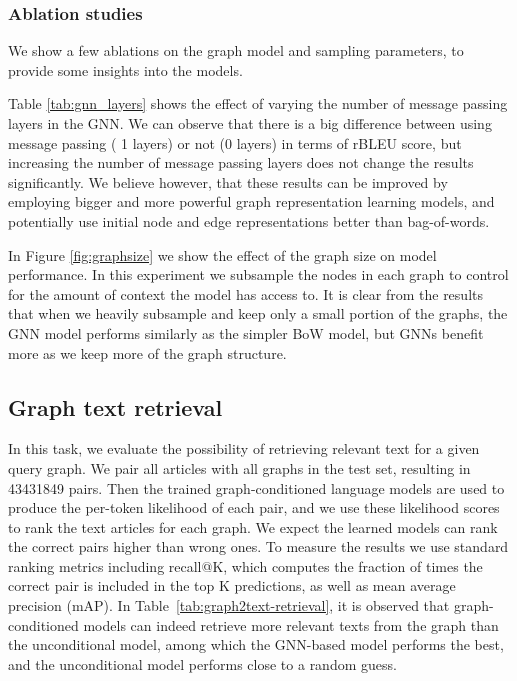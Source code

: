 \documentclass[11pt]{article}
\newcommand{\tabref}[1]{Table \ref{#1}}
\newcommand{\figref}[1]{Figure \ref{#1}}
\begin{document}
\subsubsection{Ablation studies}

We show a few ablations on the graph model and sampling parameters, to provide some insights into the models.

\tabref{tab:gnn_layers} shows the effect of varying the number of message passing layers in the GNN. 
We can observe that there is a big difference between using message passing (  1 layers) or not (0 layers) in terms of rBLEU score, but increasing the number of message passing layers does not change the results significantly.  
We believe however, that these results can be improved by employing bigger and more powerful graph representation learning models, and potentially use initial node and edge representations better than bag-of-words.

In \figref{fig:graphsize} we show the effect of the graph size on model performance.  In this experiment we subsample the nodes in each graph to control for the amount of context the model has access to.  It is clear from the results that when we heavily subsample and keep only a small portion of the graphs, the GNN model performs similarly as the simpler BoW model, but GNNs benefit more as we keep more of the graph structure.






\subsection{Graph  text retrieval}
\label{sec:g2t_retrieval}
In this task, we evaluate the possibility of retrieving relevant text for a given query graph.  We pair all articles with all graphs in the test set, resulting in 43431849 pairs.
Then the trained graph-conditioned language models are used to produce the per-token likelihood of each pair, and we use these likelihood scores to rank the text articles for each graph.  We expect the learned models can rank the correct pairs higher than wrong ones. To measure the results we use standard ranking metrics including recall@K, which computes the fraction of times the correct pair is included in the top K predictions, as well as mean average precision (mAP). In Table~\ref{tab:graph2text-retrieval}, it is observed that graph-conditioned models can indeed retrieve more relevant texts from the graph than the unconditional model,
among which the GNN-based model performs the best, and the unconditional model performs close to a random guess.
\end{document}
